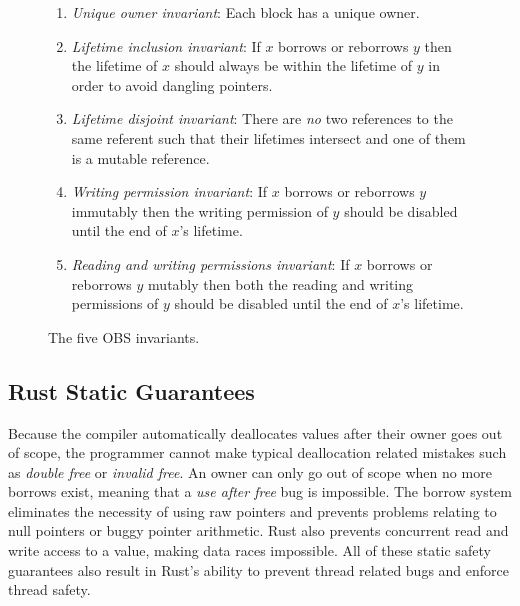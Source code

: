 \begin{figure}[h]
\centering
\begin{enumerate}
    \item \textit{Unique owner invariant}: Each block has a unique owner.
    \item \textit{Lifetime inclusion invariant}: If $x$ borrows or reborrows $y$ then the lifetime of $x$ should always be within the lifetime of $y$ in order to avoid dangling pointers.
    \item \textit{Lifetime disjoint invariant}: There are \textit{no} two references to the same referent such that their lifetimes intersect and one of them is a mutable reference.
    \item \textit{Writing permission invariant}: If $x$ borrows or reborrows $y$ immutably then the writing permission of $y$ should be disabled until the end of $x$'s lifetime.
    \item \textit{Reading and writing permissions invariant}: If $x$ borrows or reborrows $y$ mutably then both the reading and writing permissions of $y$ should be disabled until the end of $x$'s lifetime.
\end{enumerate}
\caption{The five OBS invariants.\cite{Kan2018AnEO}}
\label{fig:obsinvariants}
\end{figure}

\subsection{Rust Static Guarantees}
Because the compiler automatically deallocates values after their owner goes out of scope, the programmer cannot make typical deallocation related mistakes such as \textit{double free} or \textit{invalid free}.
An owner can only go out of scope when no more borrows exist, meaning that a \textit{use after free} bug is impossible.
The borrow system eliminates the necessity of using raw pointers and prevents problems relating to null pointers or buggy pointer arithmetic.
Rust also prevents concurrent read and write access to a value, making data races impossible.
All of these static safety guarantees also result in Rust's ability to prevent thread related bugs and enforce thread safety.


